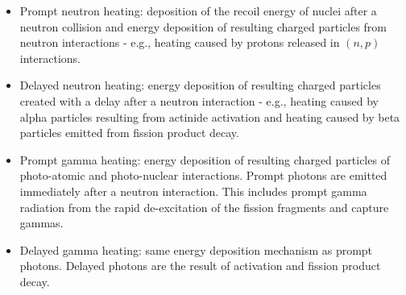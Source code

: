 \begin{itemize}
  \item Prompt neutron heating: deposition of the recoil energy of nuclei after a neutron collision and energy deposition of resulting charged particles from neutron interactions - e.g., heating caused by protons released in $(n,p)$ interactions.
  \item Delayed neutron heating: energy deposition of resulting charged particles created with a delay after a neutron interaction - e.g., heating caused by alpha particles resulting from actinide activation and heating caused by beta particles emitted from fission product decay.
  \item Prompt gamma heating: energy deposition of resulting charged particles of photo-atomic and photo-nuclear interactions. Prompt photons are emitted immediately after a neutron interaction. This includes prompt gamma radiation from the rapid de-excitation of the fission fragments and capture gammas.
  \item Delayed gamma heating: same energy deposition mechanism as prompt photons. Delayed photons are the result of activation and fission product decay.
\end{itemize}
